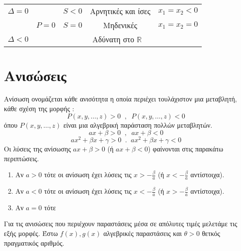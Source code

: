 \documentclass[twoside,nofonts,internet,shmeiwseis]{thewria}
\begin{document}
\begin{enumerate}
\begin{center}
\begin{longtable}{c|c|c|cc}
\hhline{~|~|-|~~} \rule[-2ex]{0pt}{5.5ex} $ \varDelta=0 $ &  & $ S<0 $ & Αρνητικές και ίσες & $ x_1=x_2<0 $ \\ 
\hhline{~|--|~~} \rule[-2ex]{0pt}{5.5ex}  & $ P=0 $ & $ S=0 $ & Μηδενικές & $ x_1=x_2=0 $ \\ 
\hhline{-----} \rule[-2ex]{0pt}{5.5ex} $ \varDelta<0 $ & \multicolumn{4}{c}{Αδύνατη στο $ \mathbb{R} $}  \\ 
\hline 
\end{longtable}
\end{center}
\end{enumerate}
\section{Ανισώσεις}
\orismoi
{}
Ανίσωση ονομάζεται κάθε ανισότητα η οποία περιέχει τουλάχιστον μια μεταβλητή, κάθε σχέση της μορφής :
\[ P(x,y,\ldots,z)>0\;\;,\;\;P(x,y,\ldots,z)<0 \]
όπου $ P(x,y,\ldots,z) $ είναι μια αλγεβρική παράσταση πολλών μεταβλητών.
\[ ax+\beta>0\;\;,\;\;ax+\beta<0 \] 
\[ ax^2+\beta x+\gamma>0\;\;.\;\;ax^2+\beta x+\gamma<0 \]
\thewrhmata
{}
Οι λύσεις της ανίσωσης $ ax+\beta>0 $ (ή $ ax+\beta<0 $) φαίνονται στις παρακάτω περιπτώσεις.
\begin{enumerate}
\item Αν $ a>0 $ τότε οι ανίσωση έχει λύσεις τις $ x>-\frac{\beta}{a} $ (ή $ x<-\frac{\beta}{a} $ αντίστοιχα).
\item Αν $ a<0 $ τότε οι ανίσωση έχει λύσεις τις $ x<-\frac{\beta}{a} $ (ή $ x>-\frac{\beta}{a} $ αντίστοιχα).
\item Αν $ a=0 $ τότε
\end{enumerate}
Για τις ανισώσεις που περιέχουν παραστάσεις μέσα σε απόλυτες τιμές μελετάμε τις εξής μορφές. Έστω $ f(x),g(x) $ αλγεβρικές παραστάσεις και $ \theta>0 $ θετκός πραγματικός αριθμός.
\end{document}
